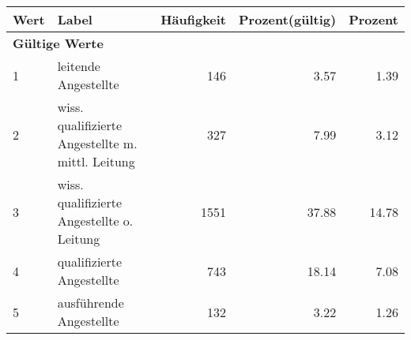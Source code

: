      \begin{longtable}{lXrrr}
     \toprule
     \textbf{Wert} & \textbf{Label} & \textbf{Häufigkeit} & \textbf{Prozent(gültig)} & \textbf{Prozent} \\
     \endhead
     \midrule
     \multicolumn{5}{l}{\textbf{Gültige Werte}}\\

     1 &
     \multicolumn{1}{X}{ leitende Angestellte   } &


       \num{146} &
       \num[round-mode=places,round-precision=2]{3,57} &
         \num[round-mode=places,round-precision=2]{1,39} \\

     2 &
     \multicolumn{1}{X}{ wiss. qualifizierte Angestellte m. mittl. Leitung   } &


       \num{327} &
       \num[round-mode=places,round-precision=2]{7,99} &
         \num[round-mode=places,round-precision=2]{3,12} \\

     3 &
     \multicolumn{1}{X}{ wiss. qualifizierte Angestellte o. Leitung   } &


       \num{1551} &
       \num[round-mode=places,round-precision=2]{37,88} &
         \num[round-mode=places,round-precision=2]{14,78} \\

     4 &
     \multicolumn{1}{X}{ qualifizierte Angestellte   } &


       \num{743} &
       \num[round-mode=places,round-precision=2]{18,14} &
         \num[round-mode=places,round-precision=2]{7,08} \\

     5 &
     \multicolumn{1}{X}{ ausführende Angestellte   } &


       \num{132} &
       \num[round-mode=places,round-precision=2]{3,22} &
         \num[round-mode=places,round-precision=2]{1,26} \\


\end{longtable}

